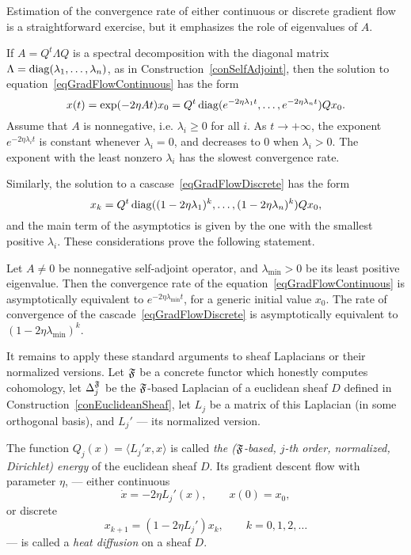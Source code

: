 Estimation of the convergence rate of either continuous or discrete gradient flow is a straightforward exercise, but it emphasizes the role of eigenvalues of $A$.

\begin{con}\label{conSolutionDiagonalized}
If $A=Q^t\Lambda Q$ is a spectral decomposition with the diagonal matrix $\Lambda=\operatorname{diag}(\lambda_1,\ldots,\lambda_n)$, as in Construction~\ref{conSelfAdjoint}, then the solution to equation~\eqref{eqGradFlowContinuous} has the form
\[
x(t)=\exp(-2\eta At)x_0=Q^t\operatorname{diag}(e^{-2\eta\lambda_1t},\ldots, e^{-2\eta\lambda_nt})Qx_0.
\]
Assume that $A$ is nonnegative, i.e. $\lambda_i\geq 0$ for all $i$. As $t\to+\infty$, the exponent $e^{-2\eta \lambda_it}$ is constant whenever $\lambda_i=0$, and decreases to $0$ when $\lambda_i>0$. The exponent with the least nonzero $\lambda_i$ has the slowest convergence rate.

Similarly, the solution to a cascase~\eqref{eqGradFlowDiscrete} has the form
\[
x_k=Q^t\operatorname{diag}((1-2\eta\lambda_1)^k,\ldots, (1-2\eta\lambda_n)^k)Qx_0,
\]
and the main term of the asymptotics is given by the one with the smallest positive $\lambda_i$. These considerations prove the following statement.
\end{con}

\begin{prop}\label{propConvergenceRate}
Let $A\neq 0$ be nonnegative self-adjoint operator, and $\lambda_{\min}>0$ be its least positive eigenvalue. Then the convergence rate of the equation~\eqref{eqGradFlowContinuous} is asymptotically equivalent to $e^{-2\eta\lambda_{\min}t}$, for a generic initial value $x_0$. The rate of convergence of the cascade~\eqref{eqGradFlowDiscrete} is asymptotically equivalent to $(1-2\eta\lambda_{\min})^k$.
\end{prop}

It remains to apply these standard arguments to sheaf Laplacians or their normalized versions. Let $\mathfrak{F}$ be a concrete functor which honestly computes cohomology, let $\Delta_j^{\mathfrak{F}}$ be the $\mathfrak{F}$-based Laplacian of a euclidean sheaf $D$ defined in Construction~\ref{conEuclideanSheaf}, let $L_j$ be a matrix of this Laplacian (in some orthogonal basis), and $L_j'$ --- its normalized version.

\begin{defin}\label{definHeatDiffusion}
The function $Q_j(x)=\langle L_j'x,x\rangle$ is called \emph{the ($\mathfrak{F}$-based, $j$-th order, normalized, Dirichlet) energy} of the euclidean sheaf $D$. Its gradient descent flow with parameter $\eta$, --- either continuous
\[
\dot{x}=-2\eta L_j'(x),\qquad x(0)=x_0,
\]
or discrete
\[
x_{k+1}=(1-2\eta L_j')x_k,\qquad k=0,1,2,\ldots
\]
--- is called a \emph{heat diffusion} on a sheaf $D$.
\end{defin}

